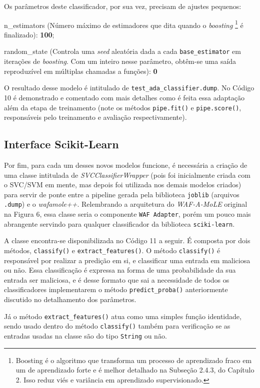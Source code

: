Os parâmetros deste classificador, por sua vez, precisam de ajustes pequenos:
\begin{alineas}
\item n\_estimators (Número máximo de estimadores que dita quando o \textit{boosting} \footnote{Boosting é o algoritmo que transforma um processo de aprendizado fraco em um de aprendizado forte e é melhor detalhado na Subseção 2.4.3, do Capítulo 2. Isso reduz viés e variância em aprendizado supervisionado.} é finalizado): \textbf{100};
\item random\_state (Controla uma \textit{seed} aleatória dada a cada \verb+base_estimator+ em iterações de \textit{boosting}. Com um inteiro nesse parâmetro, obtêm-se uma saída reproduzível em múltiplas chamadas a funções): \textbf{0}
\end{alineas}


O resultado desse modelo é intitulado de \verb+test_ada_classifier.dump+. No Código 10 é demonstrado e comentado com mais detalhes como é feita essa adaptação além da etapa de treinamento (note os métodos \verb+pipe.fit()+ e \verb+pipe.score()+, responsáveis pelo treinamento e avaliação respectivamente).

\label{sec:codigos:modelos}
\bigskip

\subsection{Interface Scikit-Learn}
Por fim, para cada um desses novos modelos funcione, é necessária a criação de uma classe intitulada de \textit{SVCClassifierWrapper} (pois foi inicialmente criada com o SVC/SVM em mente, mas depois foi utilizada nos demais modelos criados) para servir de ponte entre a pipeline gerada pela biblioteca \verb+joblib+ (arquivos \verb+.dump+) e o \textit{wafamole++}. Relembrando a arquitetura do \textit{WAF-A-MoLE} original na Figura 6, essa classe seria o componente \verb+WAF Adapter+, porém um pouco mais abrangente servindo para qualquer classificador da biblioteca  \verb+sciki-learn+.

A classe encontra-se disponibilizada no Código 11 a seguir. É composta por dois métodos, \verb+classify()+ e \verb+extract_features()+. O método \verb+classify()+ é responsável por realizar a predição em si, e classificar uma entrada em maliciosa ou não. Essa classificação é expressa na forma de uma probabilidade da sua entrada ser maliciosa, e é desse formato que sai a necessidade de todos os classificadores implementarem o método \verb+predict_proba()+ anteriormente discutido no detalhamento dos parâmetros. 

Já o método \verb+extract_features()+ atua como uma simples função identidade, sendo usado dentro do método \verb+classify()+ também para verificação se as entradas usadas na classe são do tipo \verb+String+ ou não.

\label{sec:codigos:modelos}
\bigskip



